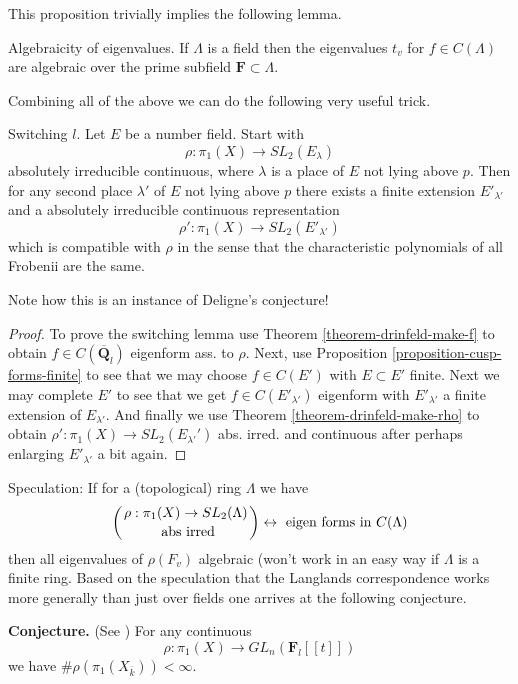 \noindent
This proposition trivially implies the following lemma.

\begin{lemma}
\label{lemma-eigenvalues-algebraic}
Algebraicity of eigenvalues.
If $\Lambda$ is a field then the eigenvalues $t_v$ for $f\in
C(\Lambda)$ are algebraic over the prime subfield
$\mathbf{F} \subset \Lambda$.
\end{lemma}

\noindent
Combining all of the above we can do the following very useful trick.

\begin{lemma}
\label{lemma-switch-l}
Switching $l$. Let $E$ be a number field.
Start with
$$
\rho: \pi_1(X)\to SL_2(E_\lambda)
$$
absolutely irreducible continuous, where $\lambda$ is a place of $E$
not lying above $p$. Then for any second place $\lambda'$ of $E$
not lying above $p$ there exists a finite extension $E'_{\lambda'}$
and a absolutely irreducible continuous representation
$$
\rho': \pi_1(X)\to SL_2(E'_{\lambda'})
$$
which is compatible with $\rho$ in the sense that the characteristic
polynomials of all Frobenii are the same.
\end{lemma}

\noindent
Note how this is an instance of Deligne's conjecture!

\begin{proof}
To prove the switching lemma use
Theorem \ref{theorem-drinfeld-make-f}
to obtain $f\in C(\overline{\mathbf{Q}}_l)$ eigenform ass. to $\rho$.
Next, use
Proposition \ref{proposition-cusp-forms-finite}
to see that we may choose $f\in C(E')$ with $E \subset E'$ finite.
Next we may complete $E'$ to see that we get
$f\in C(E'_{\lambda'})$ eigenform with
$E'_{\lambda'}$ a finite extension of $E_{\lambda'}$.
And finally we use
Theorem \ref{theorem-drinfeld-make-rho}
to obtain
$\rho': \pi_1(X) \to SL_2(E_{\lambda'}')$ abs. irred. and continuous
after perhaps enlarging $E'_{\lambda'}$ a bit again.
\end{proof}

\noindent
Speculation: If for a (topological) ring $\Lambda$ we have
$$
\left(
{\rho: \pi_1(X)\to SL_2(\Lambda)\atop \text{ abs irred}}
\right)
\leftrightarrow
\text{ eigen forms in } C(\Lambda)
$$
then all eigenvalues of $\rho(F_v)$ algebraic (won't work in an easy
way if $\Lambda$ is a finite ring. Based on the speculation that the
Langlands correspondence works more generally than just over fields
one arrives at the following conjecture.

\medskip\noindent
{\bf Conjecture.}
(See \cite{dJ-conjecture})
For any continuous
$$
\rho: \pi_1(X)\to GL_n(\mathbf{F}_l[[t]])
$$
we have $\# \rho(\pi_1(X_{\overline k}))<\infty$.

